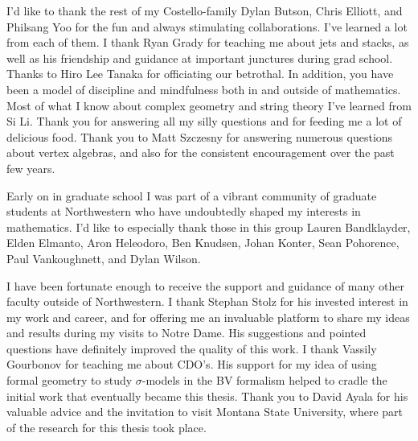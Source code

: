 I'd like to thank the rest of my Costello-family Dylan Butson, Chris Elliott, and Philsang Yoo for the fun and always stimulating collaborations. 
I've learned a lot from each of them. 
I thank Ryan Grady for teaching me about jets and stacks, as well as his friendship and guidance at important junctures during grad school. 
Thanks to Hiro Lee Tanaka for officiating our betrothal.
In addition, you have been a model of discipline and mindfulness both in and outside of mathematics.
Most of what I know about complex geometry and string theory I've learned from Si Li. 
Thank you for answering all my silly questions and for feeding me a lot of delicious food. 
Thank you to Matt Szczesny for answering numerous questions about vertex algebras, and also for the consistent encouragement over the past few years. 

Early on in graduate school I was part of a vibrant community of graduate students at Northwestern who have undoubtedly shaped my interests in mathematics.
I'd like to especially thank those in this group Lauren Bandklayder, Elden Elmanto, Aron Heleodoro, Ben Knudsen, Johan Konter, Sean Pohorence, Paul Vankoughnett, and Dylan Wilson. 

I have been fortunate enough to receive the support and guidance of many other faculty outside of Northwestern. 
I thank Stephan Stolz for his invested interest in my work and career, and for offering me an invaluable platform to share my ideas and results during my visits to Notre Dame. 
His suggestions and pointed questions have definitely improved the quality of this work. 
I thank Vassily Gourbonov for teaching me about CDO's.
His support for my idea of using formal geometry to study $\sigma$-models in the BV formalism helped to cradle the initial work that eventually became this thesis.
Thank you to David Ayala for his valuable advice and the invitation to visit Montana State University, where part of the research for this thesis took place. 
